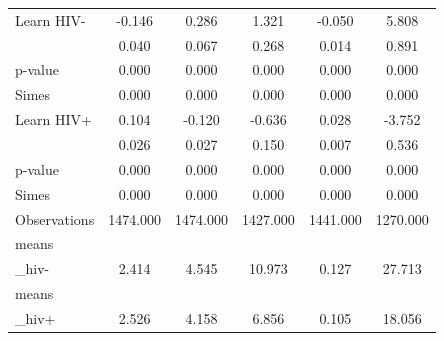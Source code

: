 \begin{tabular}{lccccc}
\hline
Learn HIV- & -0.146 & 0.286 & 1.321 & -0.050 & 5.808 \\
 & 0.040 & 0.067 & 0.268 & 0.014 & 0.891 \\
p-value & 0.000 & 0.000 & 0.000 & 0.000 & 0.000 \\
Simes & 0.000 & 0.000 & 0.000 & 0.000 & 0.000 \\
Learn HIV+ & 0.104 & -0.120 & -0.636 & 0.028 & -3.752 \\
 & 0.026 & 0.027 & 0.150 & 0.007 & 0.536 \\
p-value & 0.000 & 0.000 & 0.000 & 0.000 & 0.000 \\
Simes & 0.000 & 0.000 & 0.000 & 0.000 & 0.000 \\
Observations & 1474.000 & 1474.000 & 1427.000 & 1441.000 & 1270.000 \\
means\\_hiv- & 2.414 & 4.545 & 10.973 & 0.127 & 27.713 \\
means\\_hiv+ & 2.526 & 4.158 & 6.856 & 0.105 & 18.056 \\
\hline
\end{tabular}
